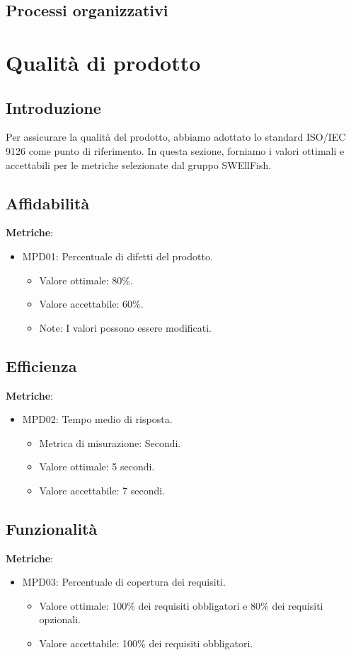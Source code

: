\documentclass[12pt]{article}
\begin{document}
\subsection{Processi organizzativi}

\section{Qualità di prodotto}
\subsection{Introduzione}
Per assicurare la qualità del prodotto, abbiamo adottato lo standard ISO/IEC 9126 come punto di riferimento. In questa sezione, forniamo i valori ottimali e accettabili per le metriche selezionate dal gruppo SWEllFish.



\subsection{Affidabilità}
\textbf{Metriche}:
\begin{itemize}
	\item MPD01: Percentuale di difetti del prodotto.
	      \begin{itemize}
		      \item Valore ottimale: 80\%.
		      \item Valore accettabile: 60\%.
		      \item Note: I valori possono essere modificati.
	      \end{itemize}
\end{itemize}


\subsection{Efficienza}
\textbf{Metriche}:
\begin{itemize}
	\item MPD02: Tempo medio di risposta.
	      \begin{itemize}
		      \item Metrica di misurazione: Secondi.
		      \item Valore ottimale: 5 secondi.
		      \item Valore accettabile: 7 secondi.
	      \end{itemize}
\end{itemize}

\subsection{Funzionalità}
\textbf{Metriche}:
\begin{itemize}
	\item MPD03: Percentuale di copertura dei requisiti.
	      \begin{itemize}
		      \item Valore ottimale: 100\% dei requisiti obbligatori e 80\% dei requisiti opzionali.
		      \item Valore accettabile: 100\% dei requisiti obbligatori.
	      \end{itemize}
\end{itemize}
\end{document}
